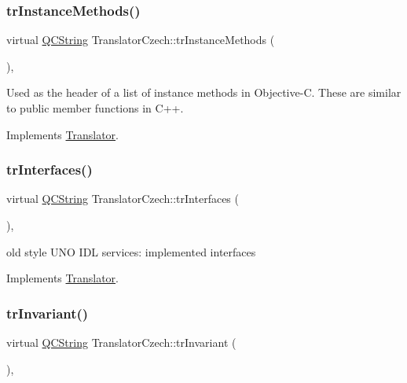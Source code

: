 \subsubsection{\texorpdfstring{trInstanceMethods()}{trInstanceMethods()}}
{\footnotesize\ttfamily virtual \mbox{\hyperlink{class_q_c_string}{Q\+C\+String}} Translator\+Czech\+::tr\+Instance\+Methods (\begin{DoxyParamCaption}{ }\end{DoxyParamCaption})\hspace{0.3cm}{\ttfamily [inline]}, {\ttfamily [virtual]}}

Used as the header of a list of instance methods in Objective-\/C. These are similar to public member functions in C++. 

Implements \mbox{\hyperlink{class_translator}{Translator}}.

\mbox{\label{class_translator_czech_af53f52a773c2e783a9b176cbf7132781}} 
\subsubsection{\texorpdfstring{trInterfaces()}{trInterfaces()}}
{\footnotesize\ttfamily virtual \mbox{\hyperlink{class_q_c_string}{Q\+C\+String}} Translator\+Czech\+::tr\+Interfaces (\begin{DoxyParamCaption}{ }\end{DoxyParamCaption})\hspace{0.3cm}{\ttfamily [inline]}, {\ttfamily [virtual]}}

old style U\+NO I\+DL services\+: implemented interfaces 

Implements \mbox{\hyperlink{class_translator}{Translator}}.

\mbox{\label{class_translator_czech_ae66cf0345e161c9ec12d6bf58be462d8}} 
\subsubsection{\texorpdfstring{trInvariant()}{trInvariant()}}
{\footnotesize\ttfamily virtual \mbox{\hyperlink{class_q_c_string}{Q\+C\+String}} Translator\+Czech\+::tr\+Invariant (\begin{DoxyParamCaption}{ }\end{DoxyParamCaption})\hspace{0.3cm}{\ttfamily [inline]}, {\ttfamily [virtual]}}

